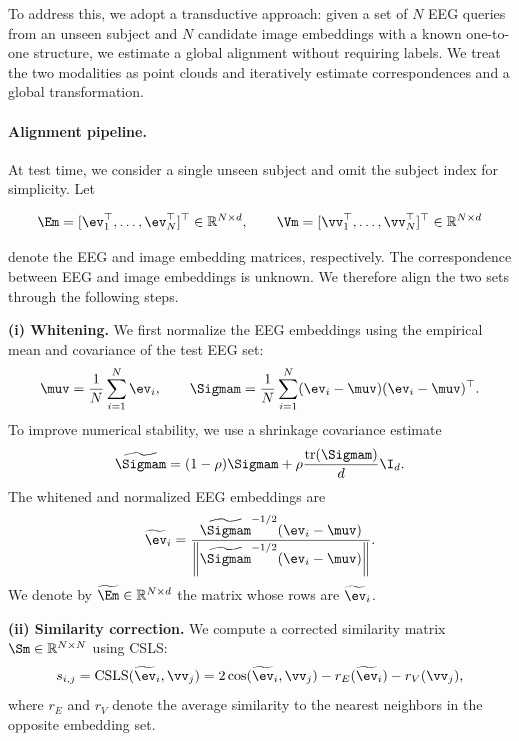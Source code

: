 To address this, we adopt a transductive approach: given a set of $N$ EEG queries from an unseen subject and $N$ candidate image embeddings with a known one-to-one structure, we estimate a global alignment without requiring labels. 
We treat the two modalities as point clouds and iteratively estimate correspondences and a global transformation.

\paragraph{Alignment pipeline.}
At test time, we consider a single unseen subject and omit the subject index for simplicity. 
Let

$$\Em = [\ev_1^\top,\ldots,\ev_N^\top]^\top \in \mathbb{R}^{N\times d},
\qquad
\Vm = [\vv_1^\top,\ldots,\vv_N^\top]^\top \in \mathbb{R}^{N\times d}$$

denote the EEG and image embedding matrices, respectively. 
The correspondence between EEG and image embeddings is unknown. 
We therefore align the two sets through the following steps.


\textbf{(i) Whitening.}
We first normalize the EEG embeddings using the empirical mean and covariance of the test EEG set:
\begin{equation}
\muv = \frac{1}{N}\sum_{i=1}^{N} \ev_i,
\qquad
\Sigmam = \frac{1}{N}\sum_{i=1}^{N}(\ev_i-\muv)(\ev_i-\muv)^\top .
\end{equation}
To improve numerical stability, we use a shrinkage covariance estimate
\begin{equation}
\widetilde{\Sigmam}
=
(1-\rho)\Sigmam
+
\rho \frac{\operatorname{tr}(\Sigmam)}{d}\I_d .
\end{equation}
The whitened and normalized EEG embeddings are
\begin{equation}
\widetilde{\ev}_i
=
\frac{
\widetilde{\Sigmam}^{-1/2}(\ev_i-\muv)
}{
\left\|\widetilde{\Sigmam}^{-1/2}(\ev_i-\muv)\right\|
}.
\end{equation}
We denote by $\widetilde{\Em}\in \mathbb{R}^{N\times d}$ the matrix whose rows are $\widetilde{\ev}_i$.

\textbf{(ii) Similarity correction.}
We compute a corrected similarity matrix $\Sm \in \mathbb{R}^{N\times N}$ using CSLS:
\begin{equation}
s_{i,j}
=
\mathrm{CSLS}(\widetilde{\ev}_i,\vv_j)
=
2\cos(\widetilde{\ev}_i,\vv_j)
-
r_E(\widetilde{\ev}_i)
-
r_V(\vv_j),
\end{equation}
where $r_E$ and $r_V$ denote the average similarity to the nearest neighbors in the opposite embedding set.

